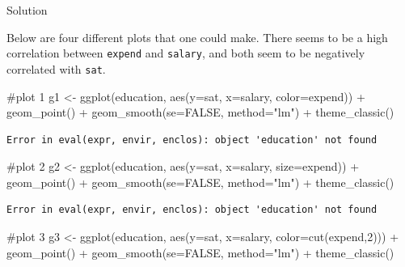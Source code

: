 \documentclass[
  letterpaper,
  DIV=11,
  numbers=noendperiod]{scrreprt}
\newenvironment{Shaded}{\begin{snugshade}}{\end{snugshade}}
\newcommand{\AttributeTok}[1]{\textcolor[rgb]{0.40,0.45,0.13}{#1}}
\newcommand{\CommentTok}[1]{\textcolor[rgb]{0.37,0.37,0.37}{#1}}
\newcommand{\ConstantTok}[1]{\textcolor[rgb]{0.56,0.35,0.01}{#1}}
\newcommand{\DecValTok}[1]{\textcolor[rgb]{0.68,0.00,0.00}{#1}}
\newcommand{\FunctionTok}[1]{\textcolor[rgb]{0.28,0.35,0.67}{#1}}
\newcommand{\NormalTok}[1]{\textcolor[rgb]{0.00,0.23,0.31}{#1}}
\newcommand{\OtherTok}[1]{\textcolor[rgb]{0.00,0.23,0.31}{#1}}
\newcommand{\SpecialCharTok}[1]{\textcolor[rgb]{0.37,0.37,0.37}{#1}}
\newcommand{\StringTok}[1]{\textcolor[rgb]{0.13,0.47,0.30}{#1}}
\begin{document}
Solution

Below are four different plots that one could make. There seems to be a
high correlation between \texttt{expend} and \texttt{salary}, and both
seem to be negatively correlated with \texttt{sat}.

\begin{Shaded}
\begin{Highlighting}[]
\CommentTok{\#plot 1}
\NormalTok{g1 }\OtherTok{\textless{}{-}} \FunctionTok{ggplot}\NormalTok{(education, }\FunctionTok{aes}\NormalTok{(}\AttributeTok{y=}\NormalTok{sat, }\AttributeTok{x=}\NormalTok{salary, }\AttributeTok{color=}\NormalTok{expend)) }\SpecialCharTok{+} 
    \FunctionTok{geom\_point}\NormalTok{() }\SpecialCharTok{+} 
    \FunctionTok{geom\_smooth}\NormalTok{(}\AttributeTok{se=}\ConstantTok{FALSE}\NormalTok{, }\AttributeTok{method=}\StringTok{"lm"}\NormalTok{) }\SpecialCharTok{+} \FunctionTok{theme\_classic}\NormalTok{()}
\end{Highlighting}
\end{Shaded}

\begin{verbatim}
Error in eval(expr, envir, enclos): object 'education' not found
\end{verbatim}

\begin{Shaded}
\begin{Highlighting}[]
\CommentTok{\#plot 2}
\NormalTok{g2 }\OtherTok{\textless{}{-}} \FunctionTok{ggplot}\NormalTok{(education, }\FunctionTok{aes}\NormalTok{(}\AttributeTok{y=}\NormalTok{sat, }\AttributeTok{x=}\NormalTok{salary, }\AttributeTok{size=}\NormalTok{expend)) }\SpecialCharTok{+} 
    \FunctionTok{geom\_point}\NormalTok{() }\SpecialCharTok{+} 
    \FunctionTok{geom\_smooth}\NormalTok{(}\AttributeTok{se=}\ConstantTok{FALSE}\NormalTok{, }\AttributeTok{method=}\StringTok{"lm"}\NormalTok{) }\SpecialCharTok{+} \FunctionTok{theme\_classic}\NormalTok{()}
\end{Highlighting}
\end{Shaded}

\begin{verbatim}
Error in eval(expr, envir, enclos): object 'education' not found
\end{verbatim}

\begin{Shaded}
\begin{Highlighting}[]
\CommentTok{\#plot 3}
\NormalTok{g3 }\OtherTok{\textless{}{-}} \FunctionTok{ggplot}\NormalTok{(education, }\FunctionTok{aes}\NormalTok{(}\AttributeTok{y=}\NormalTok{sat, }\AttributeTok{x=}\NormalTok{salary, }\AttributeTok{color=}\FunctionTok{cut}\NormalTok{(expend,}\DecValTok{2}\NormalTok{))) }\SpecialCharTok{+} 
    \FunctionTok{geom\_point}\NormalTok{() }\SpecialCharTok{+} 
    \FunctionTok{geom\_smooth}\NormalTok{(}\AttributeTok{se=}\ConstantTok{FALSE}\NormalTok{, }\AttributeTok{method=}\StringTok{"lm"}\NormalTok{) }\SpecialCharTok{+} \FunctionTok{theme\_classic}\NormalTok{()}
\end{Highlighting}
\end{Shaded}
\end{document}
